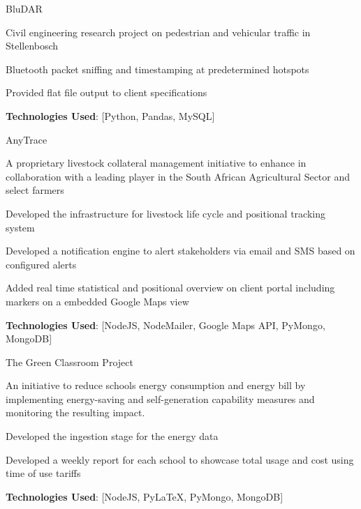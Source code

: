 
\begin{cventries}

  \cventry
    {} %
    {BluDAR} %
    {} %
    {} %
    {
      \begin{cvitems} %
        \item {Civil engineering research project on pedestrian and vehicular traffic in Stellenbosch}
        \item {Bluetooth packet sniffing and timestamping at predetermined hotspots}
        \item {Provided flat file output to client specifications}
		\item {\textbf{Technologies Used}: [Python, Pandas, MySQL]}
      \end{cvitems}
    }
    
  \cventry
    {} %
    {AnyTrace} %
    {} %
    {} %
    {
      \begin{cvitems} %
        \item {A proprietary livestock collateral management initiative to enhance in collaboration with a leading player in the South African Agricultural Sector and select farmers}
        \item {Developed the infrastructure for livestock life cycle and positional tracking system}
        \item {Developed a notification engine to alert stakeholders via email and SMS based on configured alerts}
        \item {Added real time statistical and positional overview on client portal including markers on a embedded Google Maps view}
		\item {\textbf{Technologies Used}: [NodeJS, NodeMailer, Google Maps API, PyMongo, MongoDB]}
      \end{cvitems}
    }


  \cventry
    {} %
    {The Green Classroom Project} %
    {} %
    {} %
    {
      \begin{cvitems} %
        \item {An initiative to reduce schools energy consumption and energy bill by implementing energy-saving and self-generation capability measures and monitoring the resulting impact.}
        \item {Developed the ingestion stage for the energy data}
        \item {Developed a weekly report for each school to showcase total usage and cost using time of use tariffs}
		\item {\textbf{Technologies Used}: [NodeJS, PyLaTeX, PyMongo, MongoDB]}
      \end{cvitems}
    }
    

\end{cventries}

